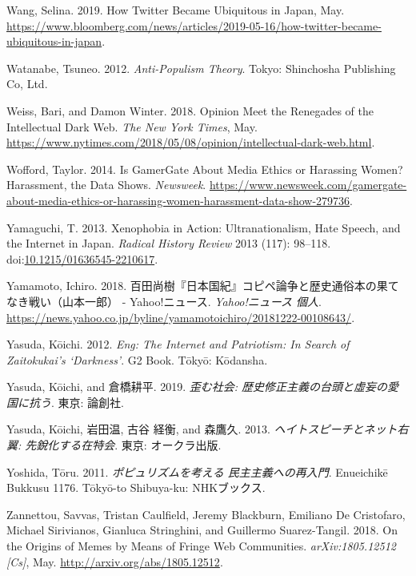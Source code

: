 \documentclass[10pt,british,A4paper,,openany]{memoir}
\begin{document}
\hypertarget{ref-wang_how_2019}{}
Wang, Selina. 2019. How Twitter Became Ubiquitous in Japan, May.
\url{https://www.bloomberg.com/news/articles/2019-05-16/how-twitter-became-ubiquitous-in-japan}.

\hypertarget{ref-watanabe_anti-populism_2012}{}
Watanabe, Tsuneo. 2012. \emph{Anti-Populism Theory}. Tokyo: Shinchosha
Publishing Co, Ltd.

\hypertarget{ref-weiss_opinion_2018}{}
Weiss, Bari, and Damon Winter. 2018. Opinion Meet the Renegades of the
Intellectual Dark Web. \emph{The New York Times}, May.
\url{https://www.nytimes.com/2018/05/08/opinion/intellectual-dark-web.html}.

\hypertarget{ref-wofford_is_2014}{}
Wofford, Taylor. 2014. Is GamerGate About Media Ethics or Harassing
Women? Harassment, the Data Shows. \emph{Newsweek}.
\url{https://www.newsweek.com/gamergate-about-media-ethics-or-harassing-women-harassment-data-show-279736}.

\hypertarget{ref-yamaguchi_xenophobia_2013}{}
Yamaguchi, T. 2013. Xenophobia in Action: Ultranationalism, Hate Speech,
and the Internet in Japan. \emph{Radical History Review} 2013 (117):
98--118.
doi:\href{https://doi.org/10.1215/01636545-2210617}{10.1215/01636545-2210617}.

\hypertarget{ref-yamamoto__2018}{}
Yamamoto, Ichiro. 2018.
百田尚樹『日本国紀』コピペ論争と歴史通俗本の果てなき戦い（山本一郎） -
Yahoo!ニュース. \emph{Yahoo!ニュース 個人}.
\url{https://news.yahoo.co.jp/byline/yamamotoichiro/20181222-00108643/}.

\hypertarget{ref-yasuda_eng:_2012}{}
Yasuda, Kōichi. 2012. \emph{Eng: The Internet and Patriotism: In Search
of Zaitokukai's `Darkness'}. G2 Book. Tōkyō: Kōdansha.

\hypertarget{ref-yasuda_:_2019}{}
Yasuda, Kōichi, and 倉橋耕平. 2019. \emph{歪む社会:
歴史修正主義の台頭と虛妄の愛国に抗う}. 東京: 論創社.

\hypertarget{ref-yasuda_:_2013}{}
Yasuda, Kōichi, 岩田温, 古谷 経衡, and 森鷹久. 2013.
\emph{ヘイトスピーチとネット右翼: 先銳化する在特会}. 東京: オークラ出版.

\hypertarget{ref-yoshida__2011}{}
Yoshida, Tōru. 2011. \emph{ポピュリズムを考える 民主主義への再入門}.
Enueichikē Bukkusu 1176. Tōkyō-to Shibuya-ku: NHKブックス.

\hypertarget{ref-zannettou_origins_2018}{}
Zannettou, Savvas, Tristan Caulfield, Jeremy Blackburn, Emiliano De
Cristofaro, Michael Sirivianos, Gianluca Stringhini, and Guillermo
Suarez-Tangil. 2018. On the Origins of Memes by Means of Fringe Web
Communities. \emph{arXiv:1805.12512 {[}Cs{]}}, May.
\url{http://arxiv.org/abs/1805.12512}.
\end{document}
